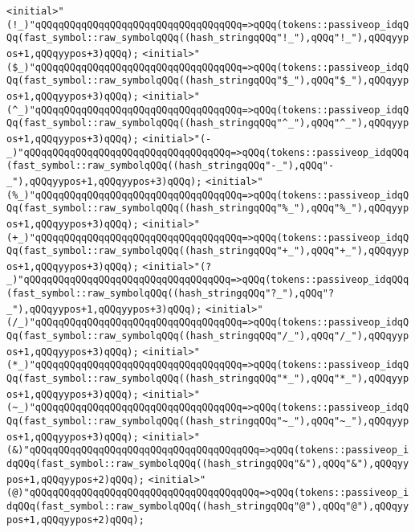\verb|<initial>"(!_)"qQQqqQQqqQQqqQQqqQQqqQQqqQQqqQQqqQQq=>qQQq(tokens::passiveop_idqQQq(fast_symbol::raw_symbolqQQq((hash_stringqQQq"!_"),qQQq"!_"),qQQqyypos+1,qQQqyypos+3)qQQq);|\newline
\verb|<initial>"($_)"qQQqqQQqqQQqqQQqqQQqqQQqqQQqqQQqqQQq=>qQQq(tokens::passiveop_idqQQq(fast_symbol::raw_symbolqQQq((hash_stringqQQq"$_"),qQQq"$_"),qQQqyypos+1,qQQqyypos+3)qQQq);|\newline
\verb|<initial>"(^_)"qQQqqQQqqQQqqQQqqQQqqQQqqQQqqQQqqQQq=>qQQq(tokens::passiveop_idqQQq(fast_symbol::raw_symbolqQQq((hash_stringqQQq"^_"),qQQq"^_"),qQQqyypos+1,qQQqyypos+3)qQQq);|\newline
\verb|<initial>"(-_)"qQQqqQQqqQQqqQQqqQQqqQQqqQQqqQQqqQQq=>qQQq(tokens::passiveop_idqQQq(fast_symbol::raw_symbolqQQq((hash_stringqQQq"-_"),qQQq"-_"),qQQqyypos+1,qQQqyypos+3)qQQq);|\newline
\verb|<initial>"(%_)"qQQqqQQqqQQqqQQqqQQqqQQqqQQqqQQqqQQq=>qQQq(tokens::passiveop_idqQQq(fast_symbol::raw_symbolqQQq((hash_stringqQQq"%_"),qQQq"%_"),qQQqyypos+1,qQQqyypos+3)qQQq);|\newline
\verb|<initial>"(+_)"qQQqqQQqqQQqqQQqqQQqqQQqqQQqqQQqqQQq=>qQQq(tokens::passiveop_idqQQq(fast_symbol::raw_symbolqQQq((hash_stringqQQq"+_"),qQQq"+_"),qQQqyypos+1,qQQqyypos+3)qQQq);|\newline
\verb|<initial>"(?_)"qQQqqQQqqQQqqQQqqQQqqQQqqQQqqQQqqQQq=>qQQq(tokens::passiveop_idqQQq(fast_symbol::raw_symbolqQQq((hash_stringqQQq"?_"),qQQq"?_"),qQQqyypos+1,qQQqyypos+3)qQQq);|\newline
\verb|<initial>"(/_)"qQQqqQQqqQQqqQQqqQQqqQQqqQQqqQQqqQQq=>qQQq(tokens::passiveop_idqQQq(fast_symbol::raw_symbolqQQq((hash_stringqQQq"/_"),qQQq"/_"),qQQqyypos+1,qQQqyypos+3)qQQq);|\newline
\verb|<initial>"(*_)"qQQqqQQqqQQqqQQqqQQqqQQqqQQqqQQqqQQq=>qQQq(tokens::passiveop_idqQQq(fast_symbol::raw_symbolqQQq((hash_stringqQQq"*_"),qQQq"*_"),qQQqyypos+1,qQQqyypos+3)qQQq);|\newline
\verb|<initial>"(~_)"qQQqqQQqqQQqqQQqqQQqqQQqqQQqqQQqqQQq=>qQQq(tokens::passiveop_idqQQq(fast_symbol::raw_symbolqQQq((hash_stringqQQq"~_"),qQQq"~_"),qQQqyypos+1,qQQqyypos+3)qQQq);|\newline
\verb|<initial>"(&)"qQQqqQQqqQQqqQQqqQQqqQQqqQQqqQQqqQQqqQQq=>qQQq(tokens::passiveop_idqQQq(fast_symbol::raw_symbolqQQq((hash_stringqQQq"&"),qQQq"&"),qQQqyypos+1,qQQqyypos+2)qQQq);|\newline
\verb|<initial>"(@)"qQQqqQQqqQQqqQQqqQQqqQQqqQQqqQQqqQQqqQQq=>qQQq(tokens::passiveop_idqQQq(fast_symbol::raw_symbolqQQq((hash_stringqQQq"@"),qQQq"@"),qQQqyypos+1,qQQqyypos+2)qQQq);|\newline
